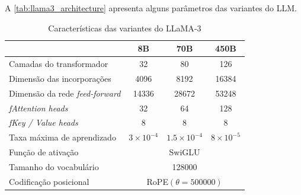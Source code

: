 A \autoref{tab:llama3_architecture} apresenta alguns parâmetros das variantes do \ac{LLM}.

\begin{table}[ht]
      \caption{Características das variantes do \ac{LLaMA}-3}
      \centering
      \begin{tabular}{l|ccc}
            \hline
                                                   & 8B                                                                   & 70B                                      & 450B                                   \\ \hline
            Camadas do transformador               & 32                                                                   & 80                                       & 126                                    \\
            Dimensão das incorporações             & 4096                                                                 & 8192                                     & 16384                                  \\
            Dimensão da rede \textit{feed-forward} & 14336                                                                & 28672                                    & 53248                                  \\
            \textit{fAttention heads}              & 32                                                                   & 64                                       & 128                                    \\
            \textit{fKey / Value heads}            & 8                                                                    & 8                                        & 8                                      \\
            Taxa máxima de aprendizado             & \begin{math}3 \times 10^{-4}\end{math}                               & \begin{math}1.5 \times 10^{-4}\end{math} & \begin{math}8 \times 10^{-5}\end{math} \\
            Função de ativação                     & \multicolumn{3}{c}{\ac{SwiGLU}}                                                                                                                          \\
            Tamanho do vocabulário                 & \multicolumn{3}{c}{128000}                                                                                                                               \\
            Codificação posicional                 & \multicolumn{3}{c}{\ac{RoPE}\begin{math}(\theta = 500000)\end{math}}                                                                                     \\ \hline
      \end{tabular}
      \label{tab:llama3_architecture}
\end{table}
